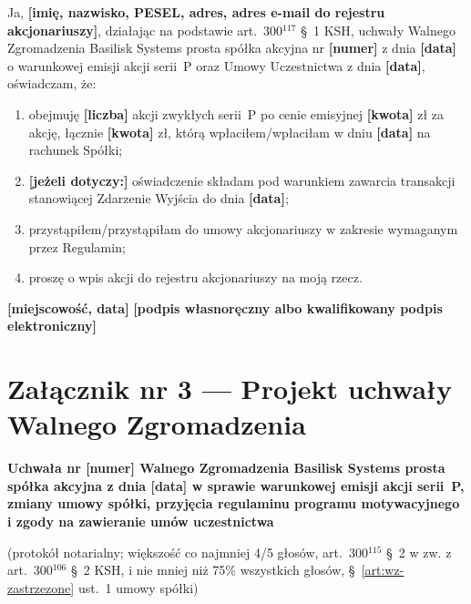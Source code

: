 \documentclass[11pt,a4paper]{report}
\newcommand{\field}[1]{\textbf{[#1]}}
\newcommand{\CompanyFull}{Basilisk Systems prosta spółka akcyjna}
\newcommand{\US}[1]{§~#1 umowy spółki}
\begin{document}
Ja, \field{imię, nazwisko, PESEL, adres, adres e-mail do rejestru akcjonariuszy}, działając na podstawie art.~300$^{117}$ §~1 KSH, uchwały Walnego Zgromadzenia \CompanyFull{} nr \field{numer} z dnia \field{data} o warunkowej emisji akcji serii~P oraz Umowy Uczestnictwa z dnia \field{data}, oświadczam, że:
\begin{enumerate}
  \item obejmuję \field{liczba} akcji zwykłych serii~P po cenie emisyjnej \field{kwota} zł za akcję, łącznie \field{kwota} zł, którą wpłaciłem/wpłaciłam w dniu \field{data} na rachunek Spółki;
  \item \field{jeżeli dotyczy:} oświadczenie składam pod warunkiem zawarcia transakcji stanowiącej Zdarzenie Wyjścia do dnia \field{data};
  \item przystąpiłem/przystąpiłam do umowy akcjonariuszy w zakresie wymaganym przez Regulamin;
  \item proszę o wpis akcji do rejestru akcjonariuszy na moją rzecz.
\end{enumerate}

\field{miejscowość, data} \hfill \field{podpis własnoręczny albo kwalifikowany podpis elektroniczny}

\chapter*{Załącznik nr 3 --- Projekt uchwały Walnego Zgromadzenia}

\textbf{Uchwała nr \field{numer} Walnego Zgromadzenia \CompanyFull{} z dnia \field{data} w sprawie warunkowej emisji akcji serii~P, zmiany umowy spółki, przyjęcia regulaminu programu motywacyjnego i zgody na zawieranie umów uczestnictwa}

{\small (protokół notarialny; większość co najmniej 4/5 głosów, art.~300$^{115}$ §~2 w zw. z art.~300$^{106}$ §~2 KSH, i nie mniej niż 75\% wszystkich głosów, \US{\ref{art:wz-zastrzezone} ust.~1})\par}
\end{document}

